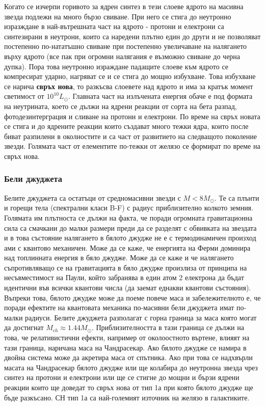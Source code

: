 \documentclass[a4paper,12pt]{article}
\begin{document}
Когато се изчерпи горивото за ядрен синтез в тези слоеве ядрото на масивна звезда подлежи на много бързо свиване. При него се стига до неутронно изразждане в най-вътрешната част на ядрото - протони и електрони са синтезирани в неутрони, които са наредени плътно един до други и не позволяват постепенно по-нататъшно свиване при постепенно увеличаване на налягането върху ядрото (все пак при огромни налягания е възможно свиване до черна дупка). Пора това неутронно израждане падащите слоеве към ядрото се компресират ударно, нагряват се и се стига до мощно избухване. Това избухване се нарича \textbf{свръх нова}, то разкъсва слоевете над ядрото и има за кратък момент светимост от $10^10 L_\odot$. Главната част на излъчената енергия обаче е под формата на неутрината, което се дължи на ядрени реакции от сорта на бета разпад, фотодезинтерграция и сливане на протони и електрони. По време на свръх новата се стига и до ядрените реакции които създават много тежки ядра, които после биват разпилени в околностите и са част от развитието на следващото поколение звезди. Голямата част от елементите по-тежки от желязо се формират по време на свръх нова.

\subsubsection{Бели джуджета}
Белите джуджета са остатъци от средномасивни звезди с $M<8M_\odot$. Те са плънти и горещи тела (спектрални класи B-F) с радиус приблизително колкото земния. Голямата им плътноста се дължи на факта, че поради огромната гравитационна сила са смачкани до малки размери преди да се разделят с обвивката на звездата и в това състояние налягането в бялото джудже не е с термодинамичен произход ами с квантово механичен. Може да се каже, че енергията на Ферми доминира над топлинната енергия в бяло джудже. Може да се каже и че налягането съпротивляващо се на гравитацията в бяло джудже произлиза от принципа на несъвместимост на Паули, който забранява в един атом 2 електрона да бъдат идентични във всички квантови числа (да заемат еднакви квантови състояния). Въпреки това, бялото джудже може да поеме повече маса и забележителното е, че поради ефектите на квантовата механика по-масивни бели джуджета имат по-малки радиуси. Белите джуджета разполагат с горна граница за маса която могат да достигнат $M_{ch} \approx 1.44 M_\odot$. Приблизителността в тази граница се дължи на това, че релативистични ефекти, например от околоостното въртене, влияят на тази граница, наричана маса на Чандрасекар. Ако бялото джудже се намира в двойна система може да акретира маса от спътника. Ако при това се надхвърли масата на Чандрасекар бялото джудже или ще колабира до неутронна звезда чрез синтез на протони и електрони или ще се стигне до мощни и бързи ядрени реакции които ще доведат то свръх нова от тип 1а при която бялото джудже ще бъде разкъсано. СН тип 1а са най-големият източник на желязо в галактиките.
\end{document}
